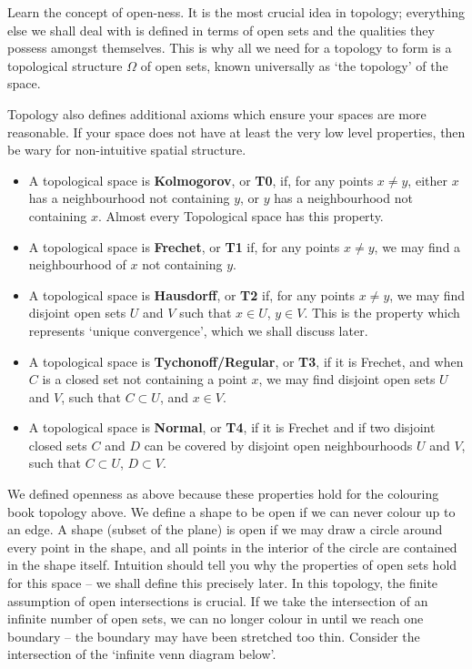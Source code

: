 Learn the concept of open-ness. It is the most crucial idea in topology; everything else we shall deal with is defined in terms of open sets and the qualities they possess amongst themselves. This is why all we need for a topology to form is a topological structure $\Omega$ of open sets, known universally as `the topology' of the space.

Topology also defines additional axioms which ensure your spaces are more reasonable. If your space does not have at least the very low level properties, then be wary for non-intuitive spatial structure.

\begin{itemize}
    \item A topological space is {\bf Kolmogorov}, or {\bf T0}, if, for any points $x \neq y$, either $x$ has a neighbourhood not containing $y$, or $y$ has a neighbourhood not containing $x$. Almost every Topological space has this property.
    \item A topological space is {\bf Frechet}, or {\bf T1} if, for any points $x \neq y$, we may find a neighbourhood of $x$ not containing $y$.
    \item A topological space is {\bf Hausdorff}, or {\bf T2} if, for any points $x \neq y$, we may find disjoint open sets $U$ and $V$ such that $x \in U$, $y \in V$. This is the property which represents `unique convergence', which we shall discuss later.
    \item A topological space is {\bf Tychonoff/Regular}, or {\bf T3}, if it is Frechet, and when $C$ is a closed set not containing a point $x$, we may find disjoint open sets $U$ and $V$, such that $C \subset U$, and $x \in V$.
    \item A topological space is {\bf Normal}, or {\bf T4}, if it is Frechet and if two disjoint closed sets $C$ and $D$ can be covered by disjoint open neighbourhoods $U$ and $V$, such that $C \subset U$, $D \subset V$.
\end{itemize}

We defined openness as above because these properties hold for the colouring book topology above. We define a shape to be open if we can never colour up to an edge. A shape (subset of the plane) is open if we may draw a circle around every point in the shape, and all points in the interior of the circle are contained in the shape itself. Intuition should tell you why the properties of open sets hold for this space -- we shall define this precisely later. In this topology, the finite assumption of open intersections is crucial. If we take the intersection of an infinite number of open sets, we can no longer colour in until we reach one boundary -- the boundary may have been stretched too thin. Consider the intersection of the `infinite venn diagram below'.


